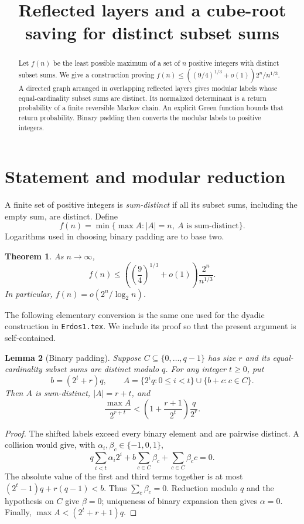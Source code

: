 \documentclass[reqno]{amsart}
\newtheorem{theorem}{Theorem}[section]
\newtheorem{lemma}[theorem]{Lemma}
\theoremstyle{remark}
\numberwithin{equation}{section}
\begin{document}
\title{Reflected layers and a cube-root saving for distinct subset sums}
\author{}
\date{}
\begin{abstract}
Let $f(n)$ be the least possible maximum of a set of $n$ positive integers
with distinct subset sums. We give a construction proving
$f(n)\leq((9/4)^{1/3}+o(1))2^n/n^{1/3}$.
A directed graph arranged in overlapping reflected layers gives modular
labels whose equal-cardinality subset sums are distinct. Its normalized
determinant is a return probability of a finite reversible Markov chain.
An explicit Green function bounds that return probability. Binary padding
then converts the modular labels to positive integers.
\end{abstract}
\maketitle

\section{Statement and modular reduction}

A finite set of positive integers is \emph{sum-distinct} if all its subset
sums, including the empty sum, are distinct. Define
\[
 f(n)=\min\{\max A: |A|=n,\ A\text{ is sum-distinct}\}.
\]
Logarithms used in choosing binary padding are to base two.

\begin{theorem}\label{thm:main}
As $n\to\infty$,
\[
 f(n)\leq\left(\left(\frac94\right)^{1/3}+o(1)\right)
                 \frac{2^n}{n^{1/3}}.
\]
In particular, $f(n)=o(2^n/\log_2 n)$.
\end{theorem}

The following elementary conversion is the same one used for the dyadic
construction in \texttt{Erdos1.tex}. We include its proof so that the present
argument is self-contained.

\begin{lemma}[Binary padding]\label{lem:padding}
Suppose $C\subseteq\{0,\ldots,q-1\}$ has size $r$ and its equal-cardinality
subset sums are distinct modulo $q$. For any integer $t\geq0$, put
\[
 b=(2^t+r)q,\qquad
 A=\{2^iq:0\leq i<t\}\cup\{b+c:c\in C\}.
\]
Then $A$ is sum-distinct, $|A|=r+t$, and
\[
 \frac{\max A}{2^{r+t}}
 <\left(1+\frac{r+1}{2^t}\right)\frac{q}{2^r}.
\]
\end{lemma}

\begin{proof}
The shifted labels exceed every binary element and are pairwise distinct.
A collision would give, with $\alpha_i,\beta_c\in\{-1,0,1\}$,
\[
 q\sum_{i<t}\alpha_i2^i+b\sum_{c\in C}\beta_c
       +\sum_{c\in C}\beta_c c=0.
\]
The absolute value of the first and third terms together is at most
$(2^t-1)q+r(q-1)<b$. Thus $\sum_c\beta_c=0$. Reduction modulo $q$ and
the hypothesis on $C$ give $\beta=0$; uniqueness of binary expansion then
gives $\alpha=0$. Finally, $\max A<(2^t+r+1)q$.
\end{proof}
\end{document}
